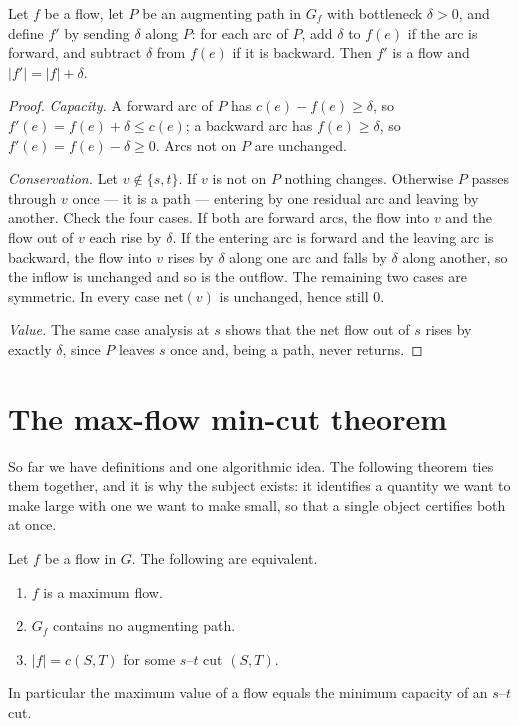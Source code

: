 \begin{lemma}[Augmentation]\label{lem:flow-augment}
Let $f$ be a flow, let $P$ be an augmenting path in $G_f$ with bottleneck
$\delta > 0$, and define $f'$ by sending $\delta$ along $P$: for each arc of
$P$, add $\delta$ to $f(e)$ if the arc is forward, and subtract $\delta$ from
$f(e)$ if it is backward. Then $f'$ is a flow and $|f'| = |f| + \delta$.
\end{lemma}

\begin{proof}
\emph{Capacity.} A forward arc of $P$ has $c(e) - f(e) \ge \delta$, so
$f'(e) = f(e) + \delta \le c(e)$; a backward arc has $f(e) \ge \delta$, so
$f'(e) = f(e) - \delta \ge 0$. Arcs not on $P$ are unchanged.

\emph{Conservation.} Let $v \notin \{s,t\}$. If $v$ is not on $P$ nothing
changes. Otherwise $P$ passes through $v$ once --- it is a path --- entering by
one residual arc and leaving by another. Check the four cases. If both are
forward arcs, the flow into $v$ and the flow out of $v$ each rise by $\delta$.
If the entering arc is forward and the leaving arc is backward, the flow into
$v$ rises by $\delta$ along one arc and falls by $\delta$ along another, so the
inflow is unchanged and so is the outflow. The remaining two cases are
symmetric. In every case $\mathrm{net}(v)$ is unchanged, hence still $0$.

\emph{Value.} The same case analysis at $s$ shows that the net flow out of $s$
rises by exactly $\delta$, since $P$ leaves $s$ once and, being a path, never
returns.
\end{proof}

\section{The max-flow min-cut theorem}
\label{sec:flow-maxflow-mincut}

So far we have definitions and one algorithmic idea. The following theorem
ties them together, and it is why the subject exists: it identifies a quantity
we want to make large with one we want to make small, so that a single object
certifies both at once.

\begin{theorem}\label{thm:flow-mfmc}
Let $f$ be a flow in $G$. The following are equivalent.
\begin{enumerate}[label=(\roman*)]
  \item $f$ is a maximum flow.
  \item $G_f$ contains no augmenting path.
  \item $|f| = c(S,T)$ for some $s$--$t$ cut $(S,T)$.
\end{enumerate}
In particular the maximum value of a flow equals the minimum capacity of an
$s$--$t$ cut.
\end{theorem}

